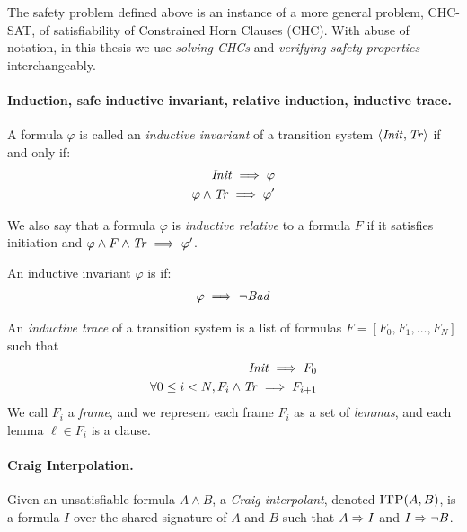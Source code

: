 The safety problem defined above is an instance of a more general problem,
CHC-SAT, of satisfiability of Constrained Horn Clauses (CHC). With abuse of
notation, in this thesis we use \textit{solving CHCs} and \textit{verifying
  safety properties} interchangeably.

\paragraph{Induction, safe inductive invariant, relative induction, inductive trace.}
A formula $\varphi$ is called an \emph{inductive invariant} of a transition
system $\langle \mathit{Init}, \mathit{Tr}\rangle$ if and only if:
\begin{align}
  \mathit{Init} \implies \varphi\\
  \varphi \land \mathit{Tr} \implies \varphi'
\end{align}

We also say that a formula $\varphi$ is \emph{inductive relative} to a formula
$F$ if it satisfies initiation and $\varphi \land F \land \mathit{Tr} \implies \varphi'$.

An inductive invariant $\varphi$ is \safe if:
\begin{align}
  \varphi \implies \lnot \mathit{Bad}
\end{align}

An \emph{inductive trace} of a transition system is a list of formulas $F = [F_0, F_1, \dots, F_N]$ such
that
\begin{align}
  \mathit{Init} \implies F_0 \\
  \forall 0 \leq i < N , F_i \land \mathit{Tr} \implies F_{i+1}
\end{align}
We call $F_i$ a \emph{frame}, and we represent each frame $F_i$ as a set of \emph{lemmas}, and each lemma $\ell \in
F_i$ is a clause.

\paragraph{Craig Interpolation.} Given an unsatisfiable formula $A \land B$, a \emph{Craig
interpolant}, denoted $\textsc{ITP}(A,B)$, is a formula $I$ over the shared signature of
$A$ and $B$ such that $A \Rightarrow I$ and $I \Rightarrow \neg B$.



